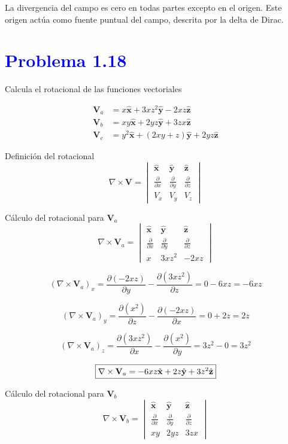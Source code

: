 \documentclass[12pt]{article}
\newcommand{\question}[1]{\textcolor{blue}{\textbf{#1}}}
\begin{document}
La divergencia del campo es cero en todas partes excepto en el origen. Este origen actúa como fuente puntual del campo, descrita por la delta de Dirac.


\section*{ \question{Problema 1.18}}  Calcula el rotacional de las funciones vectoriales

\begin{align*}
\mathbf{V}_a &= x \hat{\mathbf{x}} + 3xz^2 \hat{\mathbf{y}} - 2xz \hat{\mathbf{z}} \\
\mathbf{V}_b &= xy \hat{\mathbf{x}} + 2yz \hat{\mathbf{y}} + 3zx \hat{\mathbf{z}} \\
\mathbf{V}_c &= y^2 \hat{\mathbf{x}} + (2xy + z) \hat{\mathbf{y}} + 2yz \hat{\mathbf{z}}
\end{align*}

Definición del rotacional
\[
\nabla \times \mathbf{V} =
\begin{vmatrix}
\hat{\mathbf{x}} & \hat{\mathbf{y}} & \hat{\mathbf{z}} \\
\frac{\partial}{\partial x} & \frac{\partial}{\partial y} & \frac{\partial}{\partial z} \\
V_x & V_y & V_z
\end{vmatrix}
\]

Cálculo del rotacional para $\mathbf{V}_a$
\[
\nabla \times \mathbf{V}_a =
\begin{vmatrix}
\hat{\mathbf{x}} & \hat{\mathbf{y}} & \hat{\mathbf{z}} \\
\frac{\partial}{\partial x} & \frac{\partial}{\partial y} & \frac{\partial}{\partial z} \\
x & 3xz^2 & -2xz
\end{vmatrix}
\]

\[
(\nabla \times \mathbf{V}_a)_x =
\frac{\partial (-2xz)}{\partial y} - \frac{\partial (3xz^2)}{\partial z} = 0 - 6xz = -6xz
\]

\[
(\nabla \times \mathbf{V}_a)_y =
\frac{\partial (x^2)}{\partial z} - \frac{\partial (-2xz)}{\partial x} = 0 + 2z = 2z
\]

\[
(\nabla \times \mathbf{V}_a)_z =
\frac{\partial (3xz^2)}{\partial x} - \frac{\partial (x^2)}{\partial y} = 3z^2 - 0 = 3z^2
\]

\[\fbox{$
\nabla \times \mathbf{V}_a = -6xz \hat{\mathbf{x}} + 2z \hat{\mathbf{y}} + 3z^2 \hat{\mathbf{z}}$}
\]

Cálculo del rotacional para $\mathbf{V}_b$
\[
\nabla \times \mathbf{V}_b =
\begin{vmatrix}
\hat{\mathbf{x}} & \hat{\mathbf{y}} & \hat{\mathbf{z}} \\
\frac{\partial}{\partial x} & \frac{\partial}{\partial y} & \frac{\partial}{\partial z} \\
xy & 2yz & 3zx
\end{vmatrix}
\]
\end{document}
